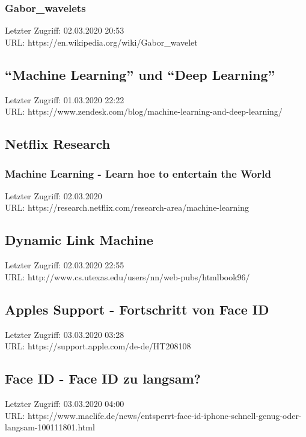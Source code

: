 	\subsubsection{Gabor_wavelets}
	\label{Gabor_wavelets}
	Letzter Zugriff: 02.03.2020 20:53\\
	URL: https://en.wikipedia.org/wiki/Gabor\_wavelet

\subsection{\enquote{Machine Learning} und \enquote{Deep Learning}}
\label{subsec:machine_learning_and_deep_learning}
	Letzter Zugriff: 01.03.2020 22:22\\
	URL: https://www.zendesk.com/blog/machine-learning-and-deep-learning/

\subsection{Netflix Research}
\label{Netlfix_Research}
	\subsubsection{Machine Learning - Learn hoe to entertain the World}
	\label{Netflix_Research:machine_learning_learn_how_to_entertain_the_world}
	Letzter Zugriff: 02.03.2020\\
	URL: https://research.netflix.com/research-area/machine-learning

\subsection{Dynamic Link Machine}
\label{subsec:dynamic_link_machine}
	Letzter Zugriff: 02.03.2020 22:55\\
	URL: http://www.cs.utexas.edu/users/nn/web-pubs/htmlbook96/

\subsection{Apples Support - Fortschritt von Face ID}
\label{apple:face_id}
	Letzter Zugriff: 03.03.2020 03:28\\
	URL: https://support.apple.com/de-de/HT208108

\subsection{Face ID - Face ID zu langsam?}
\label{maclife:face_id_too_slow}
	Letzter Zugriff: 03.03.2020 04:00\\
	URL: https://www.maclife.de/news/entsperrt-face-id-iphone-schnell-genug-oder-langsam-100111801.html

